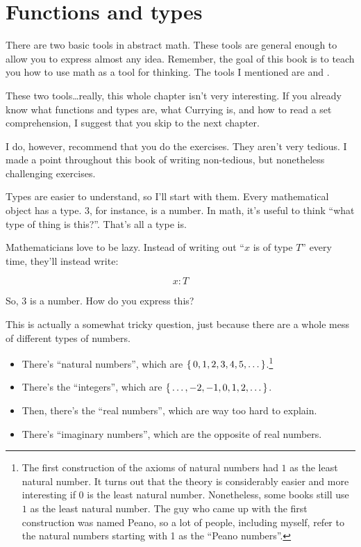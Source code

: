 \chapter{Functions and types}
\label{ch:functions}

There are two basic tools in abstract math. These tools are general enough to
allow you to express almost any idea. Remember, the goal of this book is to
teach you how to use math as a tool for thinking. The tools I mentioned are
 and .

These two tools\dots really, this whole chapter isn't very interesting. If you
already know what functions and types are, what Currying is, and how to read a
set comprehension, I suggest that you skip to the next chapter.

I do, however, recommend that you do the exercises. They aren't very tedious. I
made a point throughout this book of writing non-tedious, but nonetheless
challenging exercises.


Types are easier to understand, so I'll start with them. Every mathematical
object has a type. $3$, for instance, is a number. In math, it's useful to think
``what type of thing is this?''. That's all a type is.

Mathematicians love to be lazy. Instead of writing out ``$x$ is of type $T$''
every time, they'll instead write:

\begin{equation}
    x : T
\end{equation}

So, $3$ is a number. How do you express this?

This is actually a somewhat tricky question, just because there are a whole mess
of different types of numbers.

\begin{itemize}
  \item There's ``natural numbers'', which are
    $\left\{\, 0, 1, 2, 3, 4, 5, \dots \,\right\}$.\footnote{The first construction of the
      axioms of natural numbers had $1$ as the least natural number. It turns
      out that the theory is considerably easier and more interesting if $0$ is
      the least natural number. Nonetheless, some books still use $1$ as the
      least natural number. The guy who came up with the first construction was
      named Peano, so a lot of people, including myself, refer to the natural
      numbers starting with 1 as the ``Peano numbers''.}
  \item There's the ``integers'', which are
    \(\left\{\, \dots, -2, -1, 0, 1, 2, \dots \,\right\}\).
  \item Then, there's the ``real numbers'', which are way too hard to
    explain.
  \item There's ``imaginary numbers'', which are the opposite of real
    numbers.
\end{itemize}

